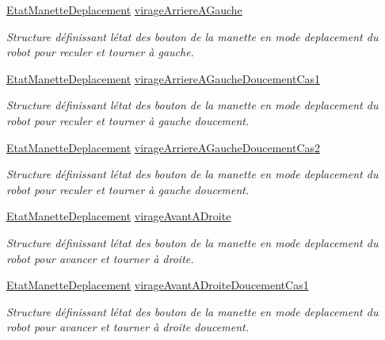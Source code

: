 \begin{DoxyCompactItemize}
\hyperlink{struct_etat_manette_deplacement}{Etat\+Manette\+Deplacement} \hyperlink{class_manette_a92a64ea372e58825097e049694e838a1}{virage\+Arriere\+A\+Gauche}
\begin{DoxyCompactList}\small\item\em Structure définissant l\textquotesingle{}état des bouton de la manette en mode deplacement du robot pour reculer et tourner à gauche. \end{DoxyCompactList}\item 
\hyperlink{struct_etat_manette_deplacement}{Etat\+Manette\+Deplacement} \hyperlink{class_manette_a984a465aac5dda20091f561339dd351d}{virage\+Arriere\+A\+Gauche\+Doucement\+Cas1}
\begin{DoxyCompactList}\small\item\em Structure définissant l\textquotesingle{}état des bouton de la manette en mode deplacement du robot pour reculer et tourner à gauche doucement. \end{DoxyCompactList}\item 
\hyperlink{struct_etat_manette_deplacement}{Etat\+Manette\+Deplacement} \hyperlink{class_manette_ac509477cff14d1ab9562c03e9db833f8}{virage\+Arriere\+A\+Gauche\+Doucement\+Cas2}
\begin{DoxyCompactList}\small\item\em Structure définissant l\textquotesingle{}état des bouton de la manette en mode deplacement du robot pour reculer et tourner à gauche doucement. \end{DoxyCompactList}\item 
\hyperlink{struct_etat_manette_deplacement}{Etat\+Manette\+Deplacement} \hyperlink{class_manette_a91afd62402f690f74a7e351c9aa8f6ec}{virage\+Avant\+A\+Droite}
\begin{DoxyCompactList}\small\item\em Structure définissant l\textquotesingle{}état des bouton de la manette en mode deplacement du robot pour avancer et tourner à droite. \end{DoxyCompactList}\item 
\hyperlink{struct_etat_manette_deplacement}{Etat\+Manette\+Deplacement} \hyperlink{class_manette_ad4aeabac283607d7d37823aabd4c5e0f}{virage\+Avant\+A\+Droite\+Doucement\+Cas1}
\begin{DoxyCompactList}\small\item\em Structure définissant l\textquotesingle{}état des bouton de la manette en mode deplacement du robot pour avancer et tourner à droite doucement. \end{DoxyCompactList}\item 

\end{DoxyCompactItemize}
